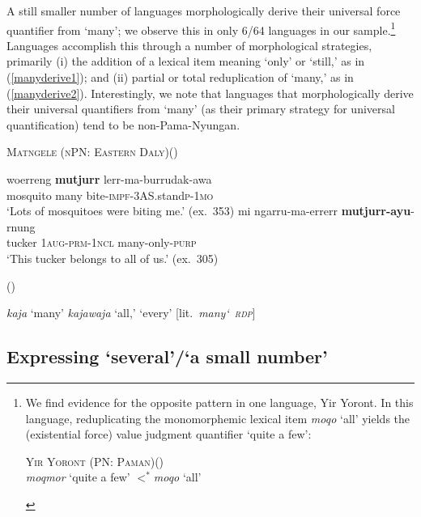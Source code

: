 \documentclass[12pt,egregdoesnotlikesansseriftitles]{scrartcl}
\begin{document}
 A still smaller number of languages morphologically derive their universal force quantifier from `many'; we observe this in only 6/64 languages in our sample.\footnote{We find evidence for the opposite pattern in one language, Yir Yoront. In this language, reduplicating the monomorphemic lexical item \textit{moqo} `all' yields the (existential force) value judgment quantifier `quite a few':

\begin{exe}
  \ex \textsc{Yir Yoront (PN: Paman)}\hfill (\citealt[375]{alpher73})\\
  \textit{\charis moqmor} `quite a few' $<^*$\textit{\charis moqo} `all'
\end{exe}}  Languages accomplish this  through a number of morphological strategies, primarily (i) the addition of a lexical item meaning `only' or `still,' as in (\ref{manyderive1});  and (ii) partial or total reduplication of `many,' as in (\ref{manyderive2}). Interestingly, we note that languages that morphologically derive their universal quantifiers from `many' (as their primary strategy for universal quantification) tend to be non-Pama-Nyungan.


\begin{exe}
  \ex  \textsc{Matngele (nPN: Eastern Daly)}\hfill (\citealt{zandvoort99}) \label{manyderive1}
  \begin{xlist}
    \ex \gll woerreng \textbf{mutjurr} lerr-ma-burrudak-awa\\
    mosquito many bite-\textsc{impf}-3AS.stand\textsc{p}-1\textsc{mo}\\
    \glt `Lots of mosquitoes were biting me.' (ex.~353) %
    \ex \gll mi ngarru-ma-errerr \textbf{mutjurr-ayu}-rnung\\
    tucker 1\textsc{aug-prm}-1\textsc{ncl} many-only-\textsc{purp}\\
    \glt `This tucker belongs to all of us.' (ex.~305)
    \end{xlist}
 \hfill(\citealt[54]{mushin12}) \label{manyderive2}
  \begin{xlist}
    \ex \textit{kaja} `many'
    \ex \textit{kajawaja}  `all,' `every' [lit.\ \textit{many\char`~\textsc{rdp}}]
  \end{xlist}
\end{exe}


 
 

\subsection{Expressing `several'/`a small number'}
\end{document}
